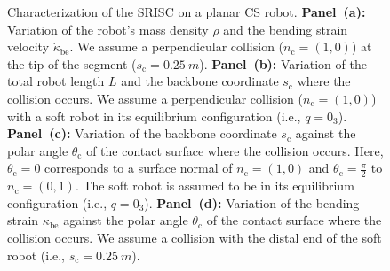 \begin{figure}[ht!]
    \caption{Characterization of the \gls{SRISC} on a planar \gls{CS} robot.
    \textbf{Panel~(a):} Variation of the robot's mass density $\rho$ and the bending strain velocity $\dot{\kappa}_\mathrm{be}$. We assume a perpendicular collision ($n_\mathrm{c} = (1,0)$) at the tip of the segment ($s_\mathrm{c} = \SI{0.25}{m}$).
    \textbf{Panel~(b):} Variation of the total robot length $L$ and the backbone coordinate $s_\mathrm{c}$ where the collision occurs. We assume a perpendicular collision ($n_\mathrm{c} = (1,0)$) with a soft robot in its equilibrium configuration (i.e., $q=0_3$).
    \textbf{Panel~(c):} Variation of the backbone coordinate $s_\mathrm{c}$ against the polar angle $\theta_\mathrm{c}$ of the contact surface where the collision occurs. Here, $\theta_\mathrm{c} = 0$ corresponds to a surface normal of $n_\mathrm{c} = (1,0)$ and $\theta_\mathrm{c} = \frac{\pi}{2}$ to $n_\mathrm{c} = (0,1)$. The soft robot is assumed to be in its equilibrium configuration (i.e., $q=0_3$).
    \textbf{Panel~(d):} Variation of the bending strain $\kappa_\mathrm{be}$ against the polar angle $\theta_\mathrm{c}$ of the contact surface where the collision occurs. We assume a collision with the distal end of the soft robot (i.e., $s_\mathrm{c} = \SI{0.25}{m}$).
    }
    \label{fig:safetymetric:planar_cs_injury_severity_criterion}
\end{figure}

